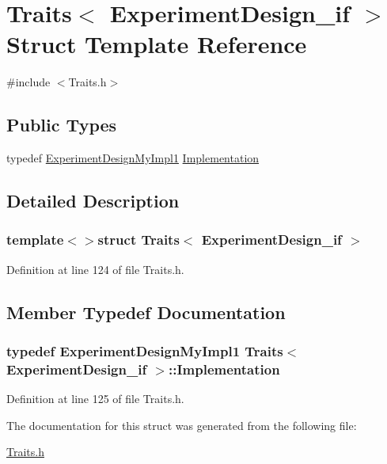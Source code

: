 \hypertarget{struct_traits_3_01_experiment_design__if_01_4}{\section{Traits$<$ Experiment\-Design\-\_\-if $>$ Struct Template Reference}
\label{struct_traits_3_01_experiment_design__if_01_4}
}


{\ttfamily \#include $<$Traits.\-h$>$}

\subsection*{Public Types}
\begin{DoxyCompactItemize}
\item 
typedef \hyperlink{class_experiment_design_my_impl1}{Experiment\-Design\-My\-Impl1} \hyperlink{struct_traits_3_01_experiment_design__if_01_4_a4db588b8322b2ff35e2df160dd3ef684}{Implementation}
\end{DoxyCompactItemize}


\subsection{Detailed Description}
\subsubsection*{template$<$$>$struct Traits$<$ Experiment\-Design\-\_\-if $>$}



Definition at line 124 of file Traits.\-h.



\subsection{Member Typedef Documentation}
\hypertarget{struct_traits_3_01_experiment_design__if_01_4_a4db588b8322b2ff35e2df160dd3ef684}{
\subsubsection[{Implementation}]{\setlength{\rightskip}{0pt plus 5cm}typedef {\bf Experiment\-Design\-My\-Impl1} {\bf Traits}$<$ {\bf Experiment\-Design\-\_\-if} $>$\-::{\bf Implementation}}}\label{struct_traits_3_01_experiment_design__if_01_4_a4db588b8322b2ff35e2df160dd3ef684}


Definition at line 125 of file Traits.\-h.



The documentation for this struct was generated from the following file\-:\begin{DoxyCompactItemize}
\item 
\hyperlink{_traits_8h}{Traits.\-h}\end{DoxyCompactItemize}
